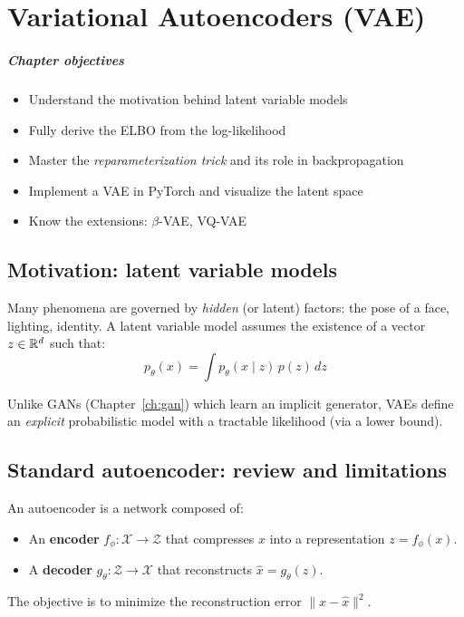 \chapter{Variational Autoencoders (VAE)}
\label{ch:vae}

\paragraph{Chapter objectives}
\begin{itemize}
\item Understand the motivation behind latent variable models
\item Fully derive the ELBO from the log-likelihood
\item Master the \emph{reparameterization trick} and its role in backpropagation
\item Implement a VAE in PyTorch and visualize the latent space
\item Know the extensions: $\beta$-VAE, VQ-VAE
\end{itemize}

\section{Motivation: latent variable models}
\label{sec:vae-motivation}

Many phenomena are governed by \emph{hidden} (or latent) factors: the pose of a face, lighting, identity. A latent variable model assumes the existence of a vector $z \in \mathbb{R}^d$ such that:
\begin{equation}
p_\theta(x) = \int p_\theta(x \mid z)\, p(z)\, dz
\label{eq:marginal-likelihood}
\end{equation}

\begin{remark}
Unlike GANs (Chapter~\ref{ch:gan}) which learn an implicit generator, VAEs define an \emph{explicit} probabilistic model with a tractable likelihood (via a lower bound).
\end{remark}

\section{Standard autoencoder: review and limitations}
\label{sec:autoencoder-standard}

\begin{definition}
An autoencoder is a network composed of:
\begin{itemize}
    \item An \textbf{encoder} $f_\phi : \mathcal{X} \to \mathcal{Z}$ that compresses $x$ into a representation $z = f_\phi(x)$.
    \item A \textbf{decoder} $g_\theta : \mathcal{Z} \to \mathcal{X}$ that reconstructs $\hat{x} = g_\theta(z)$.
\end{itemize}
The objective is to minimize the reconstruction error $\|x - \hat{x}\|^2$.
\end{definition}

